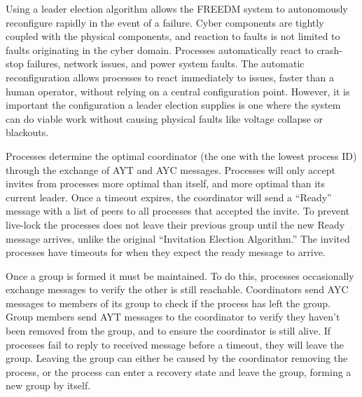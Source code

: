 Using a leader election algorithm allows the \ac{FREEDM} system to autonomously reconfigure rapidly in the event of a failure.
Cyber components are tightly coupled with the physical components, and reaction to faults is not limited to faults originating in the cyber domain.
Processes automatically react to crash-stop failures, network issues, and power system faults.
The automatic reconfiguration allows processes to react immediately to issues, faster than a human operator, without relying on a central configuration point.
However, it is important the configuration a leader election supplies is one where the system can do viable work without causing physical faults like voltage collapse or blackouts\cite{HARINI}.


Processes determine the optimal coordinator (the one with the lowest process ID) through the exchange of \ac{AYT} and \ac{AYC} messages.
Processes will only accept invites from processes more optimal than itself, and more optimal than its current leader.
Once a timeout expires, the coordinator will send a ``Ready'' message with a list of peers to all processes that accepted the invite.
To prevent live-lock the processes does not leave their previous group until the new Ready message arrives, unlike the original ``Invitation Election Algorithm.''
The invited processes have timeouts for when they expect the ready message to arrive.

Once a group is formed it must be maintained.
To do this, processes occasionally exchange messages to verify the other is still reachable.
Coordinators send \ac{AYC} messages to members of its group to check if the process has left the group.
Group members send \ac{AYT} messages to the coordinator to verify they haven't been removed from the group, and to ensure the coordinator is still alive.
If processes fail to reply to received message before a timeout, they will leave the group.
Leaving the group can either be caused by the coordinator removing the process, or the process can enter a recovery state and leave the group, forming a new group by itself.

